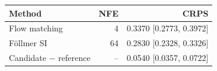 \begin{tabular}{lrr}
\toprule
Method & NFE & CRPS \\
\midrule
Flow matching & 4 & 0.3370 [0.2773, 0.3972] \\
Föllmer SI & 64 & 0.2830 [0.2328, 0.3326] \\
\midrule
Candidate $-$ reference & -- & 0.0540 [0.0357, 0.0722] \\
\bottomrule
\end{tabular}
